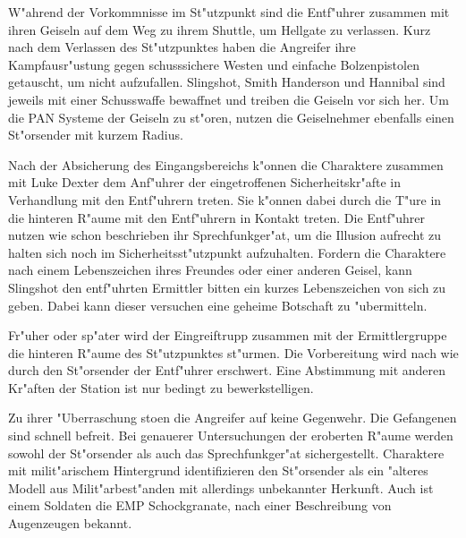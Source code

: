 
W"ahrend der Vorkommnisse im St"utzpunkt sind die Entf"uhrer zusammen mit ihren Geiseln auf dem Weg zu ihrem Shuttle, um Hellgate zu verlassen. Kurz nach dem Verlassen des St"utzpunktes haben die Angreifer ihre Kampfausr"ustung gegen schusssichere Westen und einfache Bolzenpistolen getauscht, um nicht aufzufallen. Slingshot, Smith Handerson und Hannibal sind jeweils mit einer Schusswaffe bewaffnet und treiben die Geiseln vor sich her. Um die PAN Systeme der Geiseln zu st"oren, nutzen die Geiselnehmer ebenfalls einen St"orsender mit kurzem Radius.

Nach der Absicherung des Eingangsbereichs k"onnen die Charaktere zusammen mit Luke Dexter dem Anf"uhrer der eingetroffenen Sicherheitskr"afte in Verhandlung mit den Entf"uhrern treten. Sie k"onnen dabei durch die T"ure in die hinteren R"aume mit den Entf"uhrern in Kontakt treten. Die Entf"uhrer nutzen wie schon beschrieben ihr Sprechfunkger"at, um die Illusion aufrecht zu halten sich noch im Sicherheitsst"utzpunkt aufzuhalten. Fordern die Charaktere nach einem Lebenszeichen ihres Freundes oder einer anderen Geisel, kann Slingshot den entf"uhrten Ermittler bitten ein kurzes Lebenszeichen von sich zu geben. Dabei kann dieser versuchen eine geheime Botschaft zu "ubermitteln.

Fr"uher oder sp"ater wird der Eingreiftrupp zusammen mit der Ermittlergruppe die hinteren R"aume des St"utzpunktes st"urmen. Die Vorbereitung wird nach wie durch den St"orsender der Entf"uhrer erschwert. Eine Abstimmung mit anderen Kr"aften der Station ist nur bedingt zu bewerkstelligen. 

Zu ihrer "Uberraschung sto\3en die Angreifer auf keine Gegenwehr. Die Gefangenen sind schnell befreit. Bei genauerer Untersuchungen der eroberten R"aume werden sowohl der St"orsender als auch das Sprechfunkger"at sichergestellt. Charaktere mit milit"arischem Hintergrund identifizieren den St"orsender als ein "alteres Modell aus Milit"arbest"anden mit allerdings unbekannter Herkunft. Auch ist einem Soldaten die EMP Schockgranate, nach einer Beschreibung von Augenzeugen bekannt.

